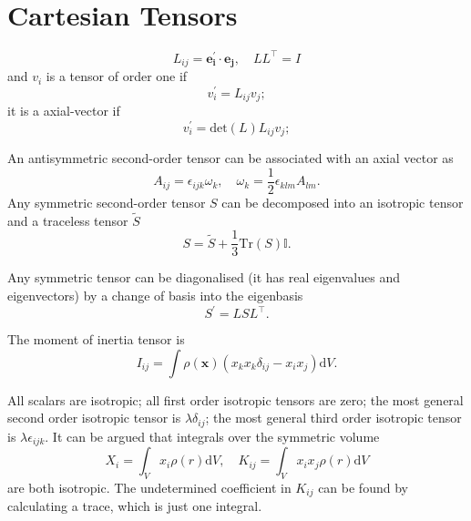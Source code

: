 \documentclass{article}
\begin{document}
\section{Cartesian Tensors}

\[
    L_{ij} = \mathbf{e_i^\prime } \cdot \mathbf{e_j}, \quad L L^{\top}  = I
\]
and $v_i$ is a tensor of order one if
\[
    v_i^\prime  = L_{ij} v_j; 
\]
it is a axial-vector if 
\[
    v_i^\prime  = \mathrm{det}(L)  L_{ij} v_j; 
\]

An antisymmetric second-order tensor can be associated with an axial vector as
\[
    A_{ij} = \epsilon_{ijk} \omega_k, \quad 
    \omega_k = \frac{1}{2} \epsilon_{klm} A_{lm}. 
\]
Any symmetric second-order tensor $S$ can be decomposed into an isotropic tensor and a traceless tensor $\tilde{S}$
\[
    S = \tilde{S} + \frac{1}{3}\mathrm{Tr}(S)\mathbb{I}.
\]

Any symmetric tensor can be diagonalised (it has real eigenvalues and eigenvectors) by a change of basis into the eigenbasis 
\[
    S^\prime = L S L^{\top}. 
\]

The moment of inertia tensor is 
\[
    I_{ij} = \int \rho(\mathbf{x} ) (x_k x_k \delta_{ij} - x_i x_j) \mathrm{d} V.  
\]

All scalars are isotropic; all first order isotropic tensors are zero; the most general second order isotropic tensor is $\lambda \delta_{ij}$; the most general third order isotropic tensor is $\lambda  \epsilon_{ijk}.$ It can be argued that integrals over the symmetric volume 
\[
    X_i = \int_{V} x_i \rho(r) \mathrm{d} V, \quad 
    K_{ij} = \int_{V} x_i x_j \rho(r) \mathrm{d} V
\]
are both isotropic. The undetermined coefficient in $K_{ij}$ can be found by calculating a trace, which is just one integral. 
\end{document}
